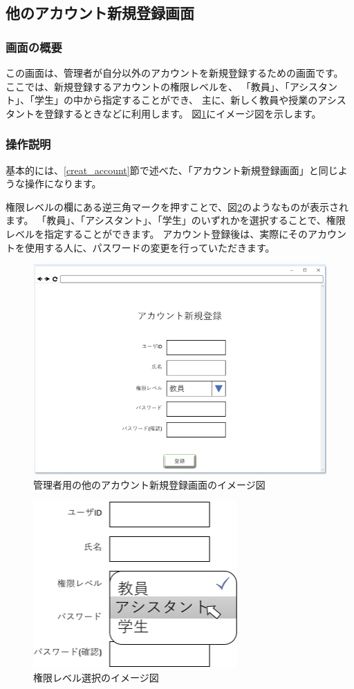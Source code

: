 \newpage

\subsection{他のアカウント新規登録画面}
\subsubsection{画面の概要}
この画面は、管理者が自分以外のアカウントを新規登録するための画面です。
ここでは、新規登録するアカウントの権限レベルを、
「教員」、「アシスタント」、「学生」の中から指定することができ、
主に、新しく教員や授業のアシスタントを登録するときなどに利用します。
図\ref{fig:07}にイメージ図を示します。

\subsubsection{操作説明}
基本的には、\ref{creat_account}節で述べた、「アカウント新規登録画面」と同じような操作になります。

権限レベルの欄にある逆三角マークを押すことで、図\ref{fig:08}のようなものが表示されます。
「教員」、「アシスタント」、「学生」のいずれかを選択することで、権限レベルを指定することができます。
アカウント登録後は、実際にそのアカウントを使用する人に、パスワードの変更を行っていただきます。

\begin{figure}[phtbp]
  \begin{center}
    \includegraphics[width=0.7\linewidth,clip]{./img/07.png}
    \caption{管理者用の他のアカウント新規登録画面のイメージ図}\label{fig:07}
  \end{center}
\end{figure}

\begin{figure}[phtbp]
  \begin{center}
    \includegraphics[width=0.3\linewidth,clip]{./img/08_.png}
    \caption{権限レベル選択のイメージ図}\label{fig:08}
  \end{center}
\end{figure}

